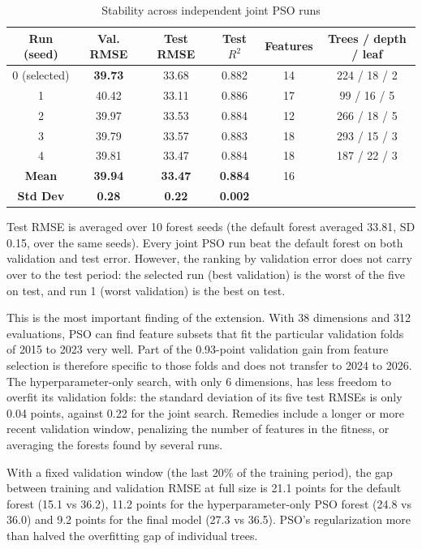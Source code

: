 \begin{table}[H]
\centering
\small
\caption{Stability across independent joint PSO runs}
\begin{tabular}{|c|c|c|c|c|c|}
\hline
\textbf{Run (seed)} & \textbf{Val. RMSE} & \textbf{Test RMSE} & \textbf{Test $R^2$} & \textbf{Features} & \textbf{Trees / depth / leaf} \\ \hline
0 (selected) & \textbf{39.73} & 33.68 & 0.882 & 14 & 224 / 18 / 2 \\
1 & 40.42 & 33.11 & 0.886 & 17 & 99 / 16 / 5 \\
2 & 39.97 & 33.53 & 0.884 & 12 & 266 / 18 / 5 \\
3 & 39.79 & 33.57 & 0.883 & 18 & 293 / 15 / 3 \\
4 & 39.81 & 33.47 & 0.884 & 18 & 187 / 22 / 3 \\ \hline
\textbf{Mean} & \textbf{39.94} & \textbf{33.47} & \textbf{0.884} & 16 & \\
\textbf{Std Dev} & \textbf{0.28} & \textbf{0.22} & \textbf{0.002} & & \\ \hline
\end{tabular}
\end{table}
Test RMSE is averaged over 10 forest seeds (the default forest averaged 33.81, SD 0.15, over the same seeds). Every joint PSO run beat the default forest on both validation and test error. However, the ranking by validation error does not carry over to the test period: the selected run (best validation) is the worst of the five on test, and run 1 (worst validation) is the best on test.

This is the most important finding of the extension. With 38 dimensions and 312 evaluations, PSO can find feature subsets that fit the particular validation folds of 2015 to 2023 very well. Part of the 0.93-point validation gain from feature selection is therefore specific to those folds and does not transfer to 2024 to 2026. The hyperparameter-only search, with only 6 dimensions, has less freedom to overfit its validation folds: the standard deviation of its five test RMSEs is only 0.04 points, against 0.22 for the joint search. Remedies include a longer or more recent validation window, penalizing the number of features in the fitness, or averaging the forests found by several runs.

With a fixed validation window (the last 20\% of the training period), the gap between training and validation RMSE at full size is 21.1 points for the default forest (15.1 vs 36.2), 11.2 points for the hyperparameter-only PSO forest (24.8 vs 36.0) and 9.2 points for the final model (27.3 vs 36.5). PSO's regularization more than halved the overfitting gap of individual trees.

